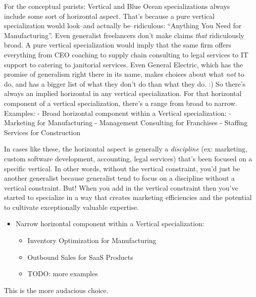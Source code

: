 For the conceptual purists: Vertical and Blue Ocean specializations always include some sort of horizontal aspect. That's because a pure vertical specialization would look--and actually be--ridiculous: ``Anything You Need for Manufacturing''. Even generalist freelancers don't make claims \emph{that} ridiculously broad. A pure vertical specialization would imply that the same firm offers everything from CEO coaching to supply chain consulting to legal services to IT support to catering to janitorial services. Even General Electric, which has the promise of generalism right there in its name, makes choices about what \emph{not} to do, and has a bigger list of what they don't do than what they do. :) So there's always an implied horizontal in any vertical specialization. For that horizontal component of a vertical specialization, there's a range from broad to narrow. Examples:
- Broad horizontal component within a Vertical specialization:
	- Marketing for Manufacturing
	- Management Consulting for Franchises
	- Staffing Services for Construction

In cases like these, the horizontal aspect is generally a \emph{discipline} (ex: marketing, custom software development, accounting, legal services) that's been focused on a specific vertical. In other words, without the vertical constraint, you'd just be another generalist because generalist tend to focus on a discipline without a vertical constraint. But! When you add in the vertical constraint then you've started to specialize in a way that creates marketing efficiencies and the potential to cultivate exceptionally valuable expertise.

\begin{itemize}
\item Narrow horizontal component within a Vertical specialization:


\begin{itemize}
\item Inventory Optimization for Manufacturing
\item Outbound Sales for SaaS Products
\item TODO: more examples
\end{itemize}
\end{itemize}

This is the more audacious choice.

